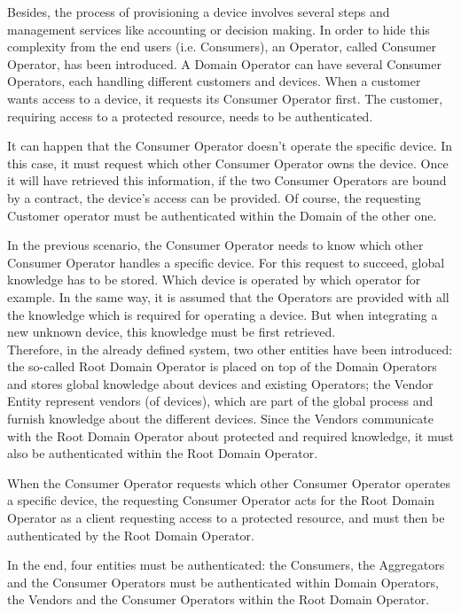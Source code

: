 	Besides, the process of provisioning a device involves several steps and management services like accounting or decision making. In order to hide this complexity from the end users (i.e. Consumers), an Operator, called Consumer Operator, has been introduced. A Domain Operator can have several Consumer Operators, each handling different customers and devices. When a customer wants access to a device, it requests its Consumer Operator first. The customer, requiring access to a protected resource, needs to be authenticated. 

It can happen that the Consumer Operator doesn't operate the specific device. In this case, it must request which other Consumer Operator owns the device. Once it will have retrieved this information, if the two Consumer Operators are bound by a contract, the device's access can be provided. Of course, the requesting Customer operator must be authenticated within the Domain of the other one.

In the previous scenario, the Consumer Operator needs to know which other Consumer Operator handles a specific device. For this request to succeed, global knowledge has to be stored. Which device is operated by which operator for example. In the same way, it is assumed that the Operators are provided with all the knowledge which is required for operating a device. But when integrating a new unknown device, this knowledge must be first retrieved. \\Therefore, in the already defined system, two other entities have been introduced: the so-called Root Domain Operator is placed on top of the Domain Operators and stores global knowledge about devices and existing Operators; the Vendor Entity represent vendors (of devices), which are part of the global process and furnish knowledge about the different devices. Since the Vendors communicate with the Root Domain Operator about protected and required knowledge, it must also be authenticated within the Root Domain Operator. 

When the Consumer Operator requests which other Consumer Operator operates a specific device, the requesting Consumer Operator acts for the Root Domain Operator as a client requesting access to a protected resource, and must then be authenticated by the Root Domain Operator.

In the end, four entities must be authenticated: the Consumers, the Aggregators and the Consumer Operators must be authenticated within Domain Operators, the Vendors and the Consumer Operators within the Root Domain Operator.

